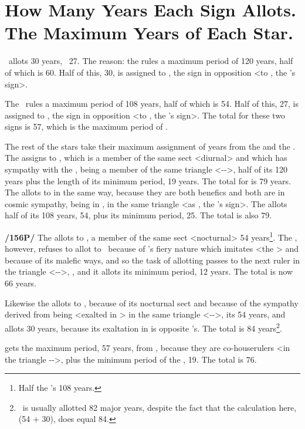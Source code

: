 \section{How Many Years Each Sign Allots. The Maximum Years of Each Star.}
\Aquarius\, allots 30 years, \Capricorn\, 27. The reason: the \Sun\xspace rules a maximum period of 120 years,
half of which is 60. Half of this, 30, is assigned to \Aquarius, the sign in opposition <to \Leo, the \Sun’s
sign>. 

The \Moon\, rules a maximum period of 108 years, half of which is 54. Half of this, 27, is assigned to \Capricorn, the sign in opposition <to \Cancer, the \Moon’s sign>. The total for these two signs is 57, which is the maximum period of \Saturn.

The rest of the stars take their maximum assignment of years from the \Sun\xspace and the \Moon. The \Sun\xspace assigns to \Jupiter, which is a member of the same sect <diurnal> and which has sympathy with the \Sun, being a member of the same triangle <\Leo-\Sagittarius-\Aries>, half of its 120 years plus the length of its minimum period, 19 years. The total for \Jupiter\xspace is 79 years. The \Moon\xspace allots to \Jupiter\xspace in the same way, because they are both benefics and both are in cosmic sympathy, \Jupiter\xspace being in \Pisces, in the same triangle <as \Cancer, the \Moon’s sign>. The \Moon\xspace allots half of its 108 years, 54, plus its minimum period, 25. The total is also 79.

\textbf{/156P/} The \Moon\xspace allots to \Mars, a member of the same sect <nocturnal> 54 years\footnote{Half the \Moon's 108 years.}. The \Sun, however,
refuses to allot to \Mars\, because of \Mars’s fiery nature which imitates <the \Sun> and because of its malefic
ways, and so the task of allotting passes to the next ruler in the triangle <\Leo-\Sagittarius-\Aries>, \Jupiter, and it allots its minimum period, 12 years. The total is now 66 years.

Likewise the \Moon\xspace allots to \Venus, because of its nocturnal sect and because of the sympathy derived from being <exalted in \Pisces> in the same triangle <\Cancer-\Pisces-\Scorpio>, its 54 years, and \Saturn\xspace allots 30 years, because its exaltation in \Libra\xspace is opposite \Venus’s. The total is 84 years\footnote{\Venus\, is usually allotted 82 major years, despite the fact that the calculation here, (54 + 30), does equal 84.}.

\Mercury\xspace gets the maximum period, 57 years, from \Saturn, because they are co-houserulers <in the triangle \Virgo-\Capricorn-\Taurus>, plus the minimum period of the \Sun, 19. The total is 76.

\newpage